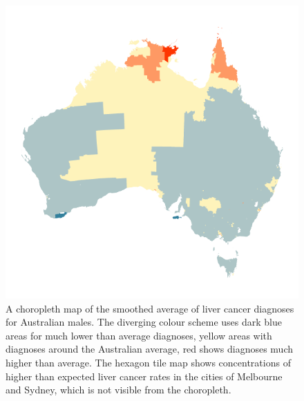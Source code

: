 \documentclass[12pt]{article}
\begin{document}
\begin{figure}
\includegraphics[width=1\linewidth]{kobakiancook_files/figure-latex/liver-1} \caption{A choropleth map of the smoothed average of liver cancer diagnoses for Australian males. The diverging colour scheme uses dark blue areas for much lower than average diagnoses, yellow areas with diagnoses around the Australian average, red shows diagnoses much higher than average. The hexagon tile map shows concentrations of higher than expected liver cancer rates in the cities of Melbourne and Sydney, which is not visible from the choropleth.}\label{fig:liver}
\end{figure}
\end{document}
